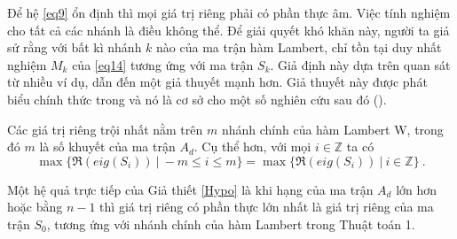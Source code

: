 \noindent Để hệ \eqref{eq9} ổn định thì mọi giá trị riêng phải có phần thực âm. Việc tính nghiệm cho tất cả các nhánh là điều không thể. Để giải quyết khó khăn này, người ta giả sử rằng với bất kì nhánh $k$ nào của ma trận hàm Lambert, chỉ tồn tại duy nhất nghiệm $M_k$ của \eqref{eq14} tương ứng với ma trận $S_k$. Giả định này dựa trên quan sát từ nhiều ví dụ, dẫn đến một giả thuyết mạnh hơn. Giả thuyết này được phát biểu chính thức trong \cite{Yi08}  và nó là cơ sở cho một số nghiên cứu sau đó (\cite{Dua12,YiEig10,YiJune12,YiDes10}).

\begin{gth}\label{Hypo}
Các giá trị riêng trội nhất nằm trên $m$ nhánh chính của hàm Lambert W, trong đó $m$ là số khuyết của ma trận $A_d$. Cụ thể hơn, với mọi $i \in \mathbb{Z}$ ta có
\begin{equation}\label{hypothesis}
\max \{ \Re(eig(S_i)) \ | \  -m \leq i \leq m \} = \max \{ \Re(eig(S_i)) \ | \  i\in\mathbb{Z} \} \ .  
\end{equation}
\end{gth}

Một hệ quả trực tiếp của Giả thiết \ref{Hypo} là khi hạng của ma trận $A_d$ lớn hơn hoặc bằng $n-1$ thì giá trị riêng có phần thực lớn nhất là giá trị riêng của ma trận $S_0$, tương ứng với nhánh chính của hàm Lambert trong Thuật toán 1.

